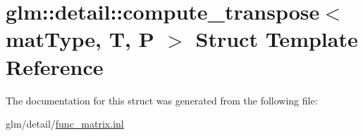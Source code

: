 \hypertarget{structglm_1_1detail_1_1compute__transpose}{\section{glm\-:\-:detail\-:\-:compute\-\_\-transpose$<$ mat\-Type, T, P $>$ Struct Template Reference}
\label{structglm_1_1detail_1_1compute__transpose}
}


The documentation for this struct was generated from the following file\-:\begin{DoxyCompactItemize}
\item 
glm/detail/\hyperlink{func__matrix_8inl}{func\-\_\-matrix.\-inl}\end{DoxyCompactItemize}
